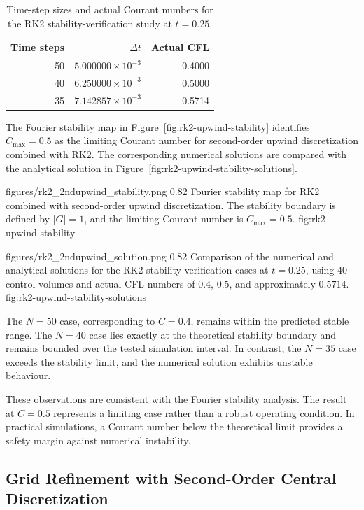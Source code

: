 \begin{table}[!htbp]
    \centering
    \caption{Time-step sizes and actual Courant numbers for the RK2 stability-verification study at $t=0.25$.}
    \label{tab:rk2-stability-verification}
    \small
    \begin{tabular}{r r r}
        \toprule
        Time steps & $\Delta t$ & Actual CFL \\
        \midrule
        50 & $5.000000\times10^{-3}$ & 0.4000 \\
        40 & $6.250000\times10^{-3}$ & 0.5000 \\
        35 & $7.142857\times10^{-3}$ & 0.5714 \\
        \bottomrule
    \end{tabular}
\end{table}

The Fourier stability map in Figure~\ref{fig:rk2-upwind-stability} identifies $C_{\max}=0.5$ as the limiting Courant number for second-order upwind discretization combined with RK2. The corresponding numerical solutions are compared with the analytical solution in Figure~\ref{fig:rk2-upwind-stability-solutions}.

\resultfigure
    {figures/rk2_2ndupwind_stability.png}
    {0.82}
    {Fourier stability map for RK2 combined with second-order upwind discretization. The stability boundary is defined by $|G|=1$, and the limiting Courant number is $C_{\max}=0.5$.}
    {fig:rk2-upwind-stability}

\resultfigure
    {figures/rk2_2ndupwind_solution.png}
    {0.82}
    {Comparison of the numerical and analytical solutions for the RK2 stability-verification cases at $t=0.25$, using 40 control volumes and actual CFL numbers of $0.4$, $0.5$, and approximately $0.5714$.}
    {fig:rk2-upwind-stability-solutions}

The $N=50$ case, corresponding to $C=0.4$, remains within the predicted stable range. The $N=40$ case lies exactly at the theoretical stability boundary and remains bounded over the tested simulation interval. In contrast, the $N=35$ case exceeds the stability limit, and the numerical solution exhibits unstable behaviour.

These observations are consistent with the Fourier stability analysis. The result at $C=0.5$ represents a limiting case rather than a robust operating condition. In practical simulations, a Courant number below the theoretical limit provides a safety margin against numerical instability.

\subsection{Grid Refinement with Second-Order Central Discretization}
\label{subsec:central-grid-convergence}

